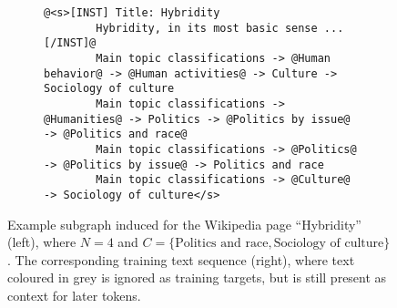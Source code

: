 \begin{figure}[t]
    \centering
    \begin{subfigure}[c]{0.443\textwidth}
        \centering
    \end{subfigure}%
    \hfill
    \begin{adjustbox}{varwidth=\linewidth,fbox}
        \begin{subfigure}[c]{0.48\textwidth}
            \centering
            \begin{lstlisting}[gobble=8,style=prompt]
        @<s>[INST] Title: Hybridity
        Hybridity, in its most basic sense ... [/INST]@
        Main topic classifications -> @Human behavior@ -> @Human activities@ -> Culture -> Sociology of culture
        Main topic classifications -> @Humanities@ -> Politics -> @Politics by issue@ -> @Politics and race@
        Main topic classifications -> @Politics@ -> @Politics by issue@ -> Politics and race
        Main topic classifications -> @Culture@ -> Sociology of culture</s>
        \end{lstlisting}
        \end{subfigure}
    \end{adjustbox}
    \caption{Example subgraph induced for the Wikipedia page ``Hybridity'' (left), where $N = 4$ and $C = \{\text{Politics and race}, \text{Sociology of culture}\}$.
        The corresponding training text sequence (right), where text coloured in grey is ignored as training targets, but is still present as context for later tokens.}
    \label{fig:prompt-example}
\end{figure}